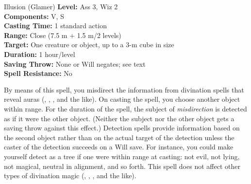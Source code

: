 {Illusion (Glamer)}
{
	\textbf{Level:}
	Ass 3, Wiz 2\\
	\textbf{Components:}
	V, S\\
	\textbf{Casting Time:}
	1 standard action\\
	\textbf{Range:}
	Close (7.5 m + 1.5 m/2 levels)\\
	\textbf{Target:}
	One creature or object, up to a 3-m cube in size\\
	\textbf{Duration:}
	1 hour/level\\
	\textbf{Saving Throw:}
	None or Will negates; see text\\
	\textbf{Spell Resistance:}
	No\\
}
{
	By means of this spell, you misdirect the information from divination spells that reveal auras (, , , and the like). On casting the spell, you choose another object within range. For the duration of the spell, the subject of \emph{misdirection} is detected as if it were the other object. (Neither the subject nor the other object gets a saving throw against this effect.) Detection spells provide information based on the second object rather than on the actual target of the detection unless the caster of the detection succeeds on a Will save. For instance, you could make yourself detect as a tree if one were within range at casting: not evil, not lying, not magical, neutral in alignment, and so forth. This spell does not affect other types of divination magic (, , , and the like).

}
